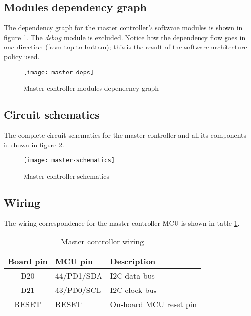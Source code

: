 \subsection{Modules dependency graph}
The dependency graph for the master controller's software modules is shown in
figure \ref{img:master-deps-graph}. The \emph{debug} module is excluded. Notice
how the dependency flow goes in one direction (from top to bottom); this is the
result of the software architecture policy used.
\begin{figure}[hbt]
\begin{centering}
  \texttt{[image: master-deps]}
  \caption{Master controller modules dependency graph}
  \label{img:master-deps-graph}
\end{centering}
\end{figure}

\subsection{Circuit schematics}
The complete circuit schematics for the master controller and all its
components is shown in figure \ref{img:master-sch}.
\begin{figure}[hbp]
\begin{centering}
  \texttt{[image: master-schematics]}
  \caption{Master controller schematics}
  \label{img:master-sch}
\end{centering}
\end{figure}

\subsection{Wiring}
The wiring correspondence for the master controller MCU is shown in table
\ref{tab:master-wiring}.
\begin{table}[hb]
  \begin{tabularx}{\textwidth}{c l X}
    \toprule
    Board pin & MCU pin & Description \\
    \midrule
    D20   & 44/PD1/SDA & I2C data bus \\
    D21   & 43/PD0/SCL & I2C clock bus \\
    RESET & RESET      & On-board MCU reset pin \\
    \bottomrule
  \end{tabularx}
  \caption{Master controller wiring}
  \label{tab:master-wiring}
\end{table}
